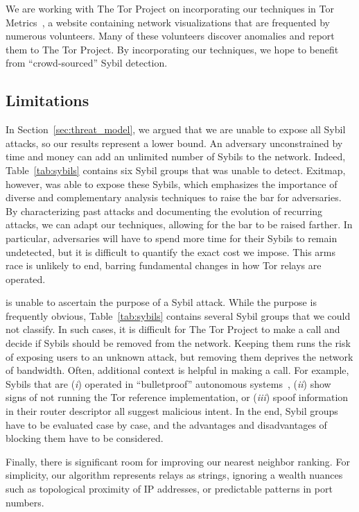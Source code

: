 We are working with The Tor Project on incorporating our techniques in Tor
Metrics~\cite{metrics}, a website containing network visualizations that are
frequented by numerous volunteers.  Many of these volunteers discover anomalies
and report them to The Tor Project.  By incorporating our techniques, we hope
to benefit from ``crowd-sourced'' Sybil detection.

\subsection{Limitations}
\label{sec:limitations}
In Section~\ref{sec:threat_model}, we argued that we are unable to expose all
Sybil attacks, so our results represent a lower bound.  An adversary
unconstrained by time and money can add an unlimited number of Sybils to the
network.  Indeed, Table~\ref{tab:sybils} contains six Sybil groups that \sys
was unable to detect.  Exitmap, however, was able to expose these Sybils, which
emphasizes the importance of diverse and complementary analysis techniques to
raise the bar for adversaries.  By characterizing past attacks and documenting
the evolution of recurring attacks, we can adapt our techniques, allowing for
the bar to be raised farther.  In particular, adversaries will have to spend
more time for their Sybils to remain undetected, but it is difficult to
quantify the exact cost we impose.  This arms race is unlikely to end, barring
fundamental changes in how Tor relays are operated.  

\Sys is unable to ascertain the purpose of a Sybil attack.  While the purpose
is frequently obvious, Table~\ref{tab:sybils} contains several Sybil groups
that we could not classify.  In such cases, it is difficult for The Tor Project
to make a call and decide if Sybils should be removed from the network.
Keeping them runs the risk of exposing users to an unknown attack, but removing
them deprives the network of bandwidth.  Often, additional context is helpful
in making a call.  For example, Sybils that are (\emph{i}) operated in
``bulletproof'' autonomous systems~\cite[\S~2]{Konte2015a}, (\emph{ii}) show
signs of not running the Tor reference implementation, or (\emph{iii}) spoof
information in their router descriptor all suggest malicious intent.  In the
end, Sybil groups have to be evaluated case by case, and the advantages and
disadvantages of blocking them have to be considered.

Finally, there is significant room for improving our nearest neighbor ranking.
For simplicity, our algorithm represents relays as strings, ignoring a wealth
nuances such as topological proximity of IP addresses, or predictable patterns
in port numbers.
